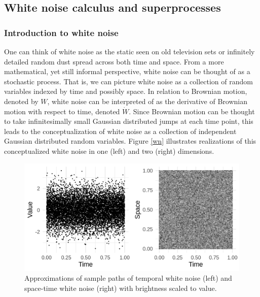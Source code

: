 \documentclass[]{article}
\begin{document}
\hypertarget{white-noise-calculus-and-superprocesses}{%
\subsection{\texorpdfstring{White noise calculus and superprocesses
\label{wnc}}{White noise calculus and superprocesses }}\label{white-noise-calculus-and-superprocesses}}

\hypertarget{introduction-to-white-noise}{%
\subsubsection{Introduction to white
noise}\label{introduction-to-white-noise}}

One can think of white noise as the static seen on old television sets
or infinitely detailed random dust spread across both time and space.
From a more mathematical, yet still informal perspective, white noise
can be thought of as a stochastic process. That is, we can picture white
noise as a collection of random variables indexed by time and possibly
space. In relation to Brownian motion, denoted by \(W\), white noise can
be interpreted of as the derivative of Brownian motion with respect to
time, denoted \(\dot W\). Since Brownian motion can be thought to take
infinitesimally small Gaussian distributed jumps at each time point,
this leads to the conceptualization of white noise as a collection of
independent Gaussian distributed random variables. Figure \ref{wn}
illustrates realizations of this conceptualized white noise in one
(left) and two (right) dimensions.

\begin{figure}

{\centering \includegraphics[width=20.83in]{wn} 

}

\caption{\label{wn}Approximations of sample paths of temporal white noise (left) and space-time white noise (right) with brightness scaled to value.}\label{fig:unnamed-chunk-2}
\end{figure}
\end{document}
